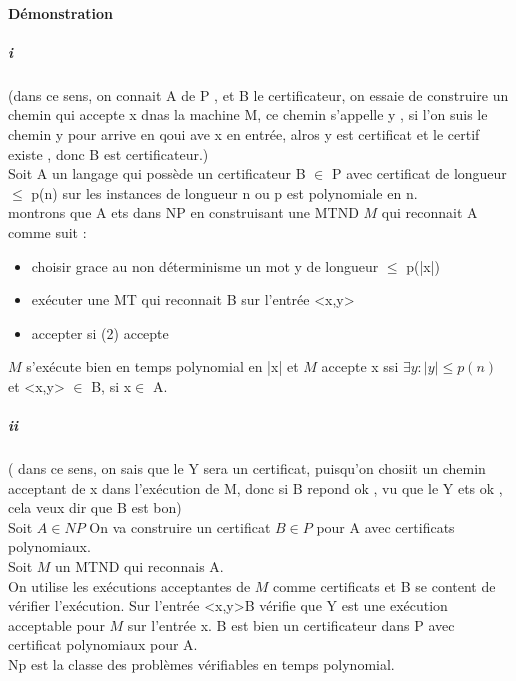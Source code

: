 \documentclass{article}
\begin{document}
\paragraph{Démonstration} 
\subparagraph{i} (dans ce sens, on connait A de P , et B le certificateur, on essaie de construire un chemin qui accepte x dnas la machine M, ce chemin s'appelle y , si l'on suis le chemin y pour arrive en qoui ave x en entrée, alros y est certificat et le certif existe , donc B est certificateur.)\\Soit A un langage qui possède un certificateur B $\in$ P avec certificat de longueur $\leq$ p(n) sur les instances de longueur n ou p est polynomiale en n.\\montrons que A ets dans NP en construisant une  MTND $M$ qui reconnait A comme suit : 
\begin{itemize}
\item choisir grace au non déterminisme un mot y de longueur $\leq$ p(|x|)
\item exécuter une MT qui reconnait B sur l'entrée <x,y> 
\item accepter si (2) accepte
\end{itemize}
$M$ s'exécute bien en temps polynomial en |x| et $M$ accepte x ssi $\exists y : |y| \leq p(n)$ et <x,y> $\in$ B, si x$\in$ A.

\subparagraph{ii} ( dans ce sens, on sais que le Y sera un certificat, puisqu'on chosiit un chemin acceptant de x dans l'exécution de M, donc si B repond ok , vu que le Y ets ok , cela veux dir que B est bon)\\Soit $A\in NP$ On va construire un certificat $B\in P$ pour A avec certificats polynomiaux.\\Soit $M$ un MTND qui reconnais A. \\On utilise les exécutions acceptantes de $M$ comme certificats et B se content de vérifier l'exécution. Sur l'entrée <x,y>B vérifie que Y est une exécution acceptable pour $M$ sur l'entrée x. B est bien un certificateur dans P avec certificat polynomiaux pour A.\\
Np est la classe des problèmes vérifiables en temps polynomial.
\end{document}
